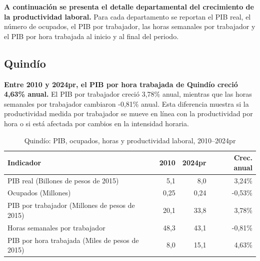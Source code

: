 \textbf{A continuación se presenta el detalle departamental del crecimiento de la productividad laboral.} Para cada departamento se reportan el PIB real, el número de ocupados, el PIB por trabajador, las horas semanales por trabajador y el PIB por hora trabajada al inicio y al final del periodo.

\subsection{Quindío}
\textbf{Entre 2010 y 2024pr, el PIB por hora trabajada de Quindío creció 4,63\% anual.} El PIB por trabajador creció 3,78\% anual, mientras que las horas semanales por trabajador cambiaron -0,81\% anual. Esta diferencia muestra si la productividad medida por trabajador se mueve en línea con la productividad por hora o si está afectada por cambios en la intensidad horaria.
\begin{table}[H]
\centering
\caption{Quindío: PIB, ocupados, horas y productividad laboral, 2010--2024pr}
\label{tab:departamento_quindio_productividad}
\scriptsize
\begin{tabular}{lrrr}
\toprule
Indicador & 2010 & 2024pr & Crec. anual \\
\midrule
PIB real (Billones de pesos de 2015) & 5,1 & 8,0 & 3,24\% \\
Ocupados (Millones) & 0,25 & 0,24 & -0,53\% \\
PIB por trabajador (Millones de pesos de 2015) & 20,1 & 33,8 & 3,78\% \\
Horas semanales por trabajador & 48,3 & 43,1 & -0,81\% \\
PIB por hora trabajada (Miles de pesos de 2015) & 8,0 & 15,1 & 4,63\% \\
\bottomrule
\end{tabular}
\end{table}

